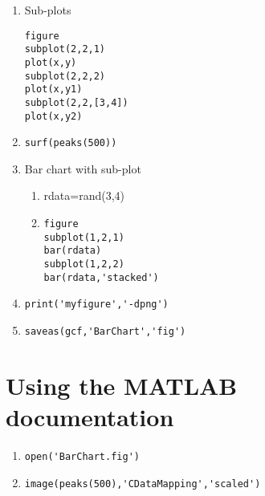 \documentclass[a4paper]{article}
\begin{document}
\begin{enumerate}
	\item Sub-plots
	
		\begin{lstlisting}[style=Matlab-editor]
figure
subplot(2,2,1)
plot(x,y)	
subplot(2,2,2)
plot(x,y1)		
subplot(2,2,[3,4])
plot(x,y2)
		\end{lstlisting}
			
	
	\item \lstinline[style=Matlab-editor]!surf(peaks(500))!
	
	\item Bar chart with sub-plot

	\begin{enumerate}
		\item rdata=rand(3,4)
		\item 	
\begin{lstlisting}[style=Matlab-editor]
figure
subplot(1,2,1)
bar(rdata)
subplot(1,2,2)
bar(rdata,'stacked')
\end{lstlisting}
	\end{enumerate}
	
	\item \lstinline[style=Matlab-editor]!print('myfigure','-dpng')!
	
	\item \lstinline[style=Matlab-editor]!saveas(gcf,'BarChart','fig')!

\end{enumerate}

\medskip

\section{Using the MATLAB documentation}
	\begin{enumerate}
		\item \lstinline[style=Matlab-editor]!open('BarChart.fig')!	
		\item \lstinline[style=Matlab-editor]!image(peaks(500),'CDataMapping','scaled')!
	\end{enumerate}
\end{document}
